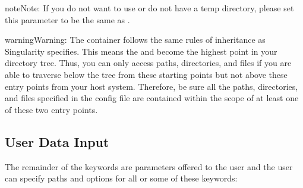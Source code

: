 \documentclass[letterpaper,10pt,english]{sphinxmanual}
\begin{document}
\begin{sphinxadmonition}{note}{Note:}
If you do not want to use or do not have a temp directory, please set this parameter to be the same as .
\end{sphinxadmonition}

\begin{sphinxadmonition}{warning}{Warning:}
 The container follows the same rules of inheritance as Singularity specifies.  This means the  and  become the highest point in your directory tree.  Thus, you can only access paths, directories, and files if you are able to traverse below the tree from these starting points but not above these entry points from your host system.  Therefore, be sure all the paths, directories, and files specified in the config file are contained within the scope of at least one of these two entry points.
\end{sphinxadmonition}


\subsection{User Data Input}
\label{\detokenize{decipheringConfig:user-data-input}}
The remainder of the keywords are parameters offered to the user and the user can specify paths and options for all or some of these keywords:
\end{document}
